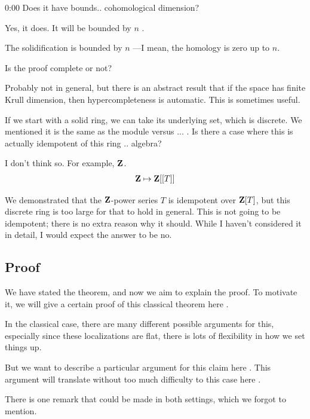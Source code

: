 \begin{unfinished}{0:00}
\ques Does it have bounds.. cohomological dimension? 

\ans Yes, it does. It will be bounded by $n$ . 

\ques The solidification is bounded by $n$ ---I mean, the homology is zero up to $n$.


\ques Is the proof complete or not?

\ans Probably not in general, but there is an abstract result that if the space has finite Krull dimension, then hypercompleteness is automatic. This is sometimes useful.

\ques If we start with a solid ring, we can take its underlying set, which is discrete. We mentioned it is the same as the module versus ...  . Is there a case where this is actually idempotent of this ring  .. algebra?

\ans I don't think so. For example, $\mathbf Z$. 
\begin{align*}
\mathbf Z \mapsto \mathbf Z[[T]]
\end{align*}

\ans We demonstrated that the $\mathbf Z$-power series $T$ is idempotent over $\mathbf Z[T]$, but this discrete ring is too large for that to hold in general. This is not going to be idempotent; there is no extra reason why it should. While I haven't considered it in detail, I would expect the answer to be no.

\subsection{Proof}

We have stated the theorem, and now we aim to explain the proof. To motivate it, we will give a certain proof of this classical theorem here . 

In the classical case, there are many different possible arguments for this, especially since these localizations are flat, there is lots of flexibility in how we set things up.

But we want to describe a particular argument for this claim here . This argument will translate without too much difficulty to this case here . 

There is one remark that could be made in both settings, which we forgot to mention.


\end{unfinished}
